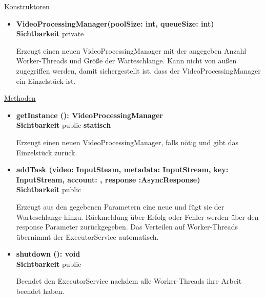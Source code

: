 \underline{Konstruktoren}
\begin{itemize}
\itemsep0pt
\item \textbf{VideoProcessingManager(poolSize: int, queueSize: int)} \hfill\\
\textbf{Sichtbarkeit} private

Erzeugt einen neuen VideoProcessingManager mit der angegeben Anzahl Worker-Threads und Größe der Warteschlange. Kann nicht von außen zugegriffen werden, damit sichergestellt ist, dass der VideoProcessingManager ein Einzelstück ist.
\end{itemize}

\underline{Methoden}
\begin{itemize}
\itemsep0pt
\item \textbf{getInstance (): VideoProcessingManager}\hfill\\
\textbf{Sichtbarkeit} public \newline
\textbf{statisch}

Erzeugt einen neuen VideoProcessingManager, falls nötig und gibt das Einzelstück zurück.

\item \textbf{addTask (video: InputSteam, metadata: InputStream, 
key: InputStream, account: , response :AsyncResponse)}\hfill\\
\textbf{Sichtbarkeit} public

Erzeugt aus den gegebenen Parametern eine neue  und fügt sie der Warteschlange hinzu. Rückmeldung über Erfolg oder Fehler werden über den response Parameter zurückgegeben. Das Verteilen auf Worker-Threads übernimmt der ExecutorService automatisch.

\item \textbf{shutdown (): void}\hfill\\
\textbf{Sichtbarkeit} public

Beendet den ExecutorService nachdem alle Worker-Threads ihre Arbeit beendet haben.

\end{itemize}